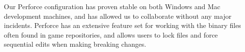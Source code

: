Our Perforce configuration has proven stable on both Windows and Mac development machines, 
and has allowed us to collaborate without any major incidents. Perforce has an extensive feature 
set for working with the binary files often found in game repositories, and allows users to lock files 
and force sequential edits when making breaking changes.\\